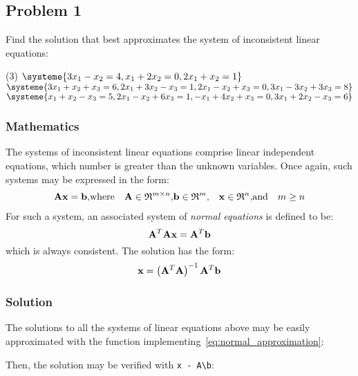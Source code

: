 \subsection{Problem 1}%
\label{sec:problem_1}
Find the solution that best approximates the system of inconsistent linear equations:
\begin{tasks}(3)
  \task $\systeme{3x_1-x_2=4,x_1+2x_2=0,2x_1+x_2=1}$
  \task $\systeme{3x_1+x_2+x_3=6,
  2x_1+3x_2-x_3=1,
  2x_1-x_2+x_3=0,
  3x_1-3x_2+3x_3=8}$
  \task $\systeme{x_1+x_2-x_3=5,
  2x_1-x_2+6x_3=1,
  -x_1+4x_2+x_3=0,
  3x_1+2x_2-x_3=6}$
\end{tasks}
\subsubsection*{Mathematics}
The systems of inconsistent linear equations comprise linear independent equations,
which number is greater than the unknown variables.
Once again, such systems may be expressed in the form:
\begin{align*}
  \mathbf{Ax}=\mathbf{b}, & \text{where} &
  \mathbf{A}\in\mathfrak{R}^{m\times{}n}, &
  \mathbf{b}\in\mathfrak{R}^m, &
  \mathbf{x}\in\mathfrak{R}^n, & \text{and} & m\geq{}n
\end{align*}
For such a system, an associated system of \textit{normal equations} is defined to be:
\begin{equation}
  \mathbf{A}^T\mathbf{Ax}=\mathbf{A}^T\mathbf{b}
\end{equation}
which is always consistent.
The solution has the form:
\begin{equation}
  \label{eq:normal_approximation}
  \mathbf{x}=\left(\mathbf{A}^T\mathbf{A}\right)^{-1}\mathbf{A}^T\mathbf{b}
\end{equation}
\subsubsection*{Solution}
The solutions to all the systems of linear equations above may be easily approximated
with the \MATLAB{} function implementing~\eqref{eq:normal_approximation}:

Then, the solution may be verified with \lstinline[style=Matlab-editor]{x - A\b}:

